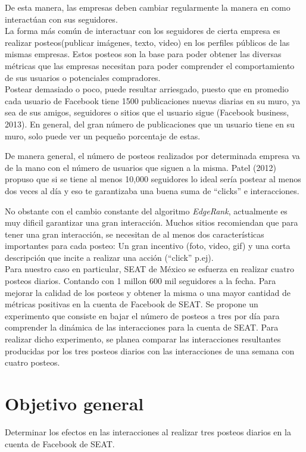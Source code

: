 \documentclass[a4paper,10pt]{article}
\begin{document}
De esta manera, las empresas deben cambiar regularmente la manera en como interactúan
con sus seguidores.
\\ [5cm]
La forma más común de interactuar con los seguidores de cierta empresa es realizar
posteos(publicar imágenes, texto, video) en los perfiles públicos de las mismas empresas.
Estos posteos son la base para poder obtener las diversas métricas que las empresas
necesitan para poder comprender el comportamiento  de sus usuarios o potenciales
compradores.\\
Postear demasiado o poco, puede resultar arriesgado, puesto que en promedio 
cada usuario de Facebook tiene 1500 publicaciones nuevas
diarias en su muro, ya sea de sus amigos, seguidores o sitios que el usuario sigue (Facebook business, 2013).
En general, del gran número de publicaciones que un usuario tiene en su muro, solo puede ver un pequeño porcentaje de estas.

De manera general, el número de posteos realizados por determinada empresa va de la mano
con el número de usuarios que siguen a la misma. Patel (2012) propuso que si se tiene al menos
10,000 seguidores lo ideal sería postear al menos dos veces al día y eso te garantizaba una 
buena suma de ``clicks''  e interacciones.

No obstante con el cambio constante del algoritmo \textit{EdgeRank}, actualmente es
muy dificil garantizar una gran interacción.
Muchos sitios recomiendan que para tener una gran interacción, se necesitan de al menos
dos características importantes para cada posteo: Un gran incentivo (foto, video, gif) 
y una corta descripción que incite a realizar una acción (``click'' p.ej).\\
Para nuestro caso en particular, SEAT  de México se esfuerza en realizar cuatro posteos
diarios. Contando con 1 millon 600 mil seguidores a la fecha.
Para mejorar la calidad de los posteos y obtener la misma o una mayor cantidad de métricas
positivas en la cuenta de Facebook de SEAT.
Se propone un experimento que consiste en bajar el número de posteos a tres por día para
comprender la dinámica de las interacciones para la cuenta de SEAT.
Para realizar dicho experimento, se planea comparar las interacciones resultantes 
producidas por los tres posteos diarios con las interacciones de una semana con cuatro posteos.



\section{Objetivo general}
Determinar los efectos en las interacciones al realizar tres posteos diarios en la 
cuenta de Facebook de SEAT.
\end{document}
